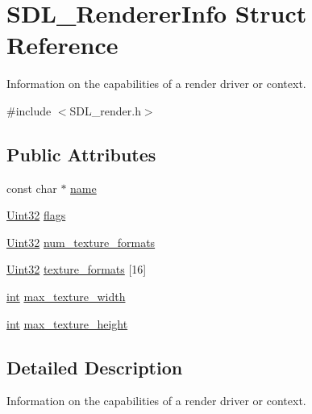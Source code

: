 \hypertarget{struct_s_d_l___renderer_info}{}\section{S\+D\+L\+\_\+\+Renderer\+Info Struct Reference}
\label{struct_s_d_l___renderer_info}


Information on the capabilities of a render driver or context.  




{\ttfamily \#include $<$S\+D\+L\+\_\+render.\+h$>$}

\subsection*{Public Attributes}
\begin{DoxyCompactItemize}
\item 
const char $\ast$ \mbox{\hyperlink{struct_s_d_l___renderer_info_a433ecb2865c81ba9f28038e56a4ae6f3}{name}}
\item 
\mbox{\hyperlink{_s_d_l__stdinc_8h_add440eff171ea5f55cb00c4a9ab8672d}{Uint32}} \mbox{\hyperlink{struct_s_d_l___renderer_info_a95cf0ffd1704fd0a4dd8ceac6c9f0542}{flags}}
\item 
\mbox{\hyperlink{_s_d_l__stdinc_8h_add440eff171ea5f55cb00c4a9ab8672d}{Uint32}} \mbox{\hyperlink{struct_s_d_l___renderer_info_acdec165b2053b914313f5996983ec6b8}{num\+\_\+texture\+\_\+formats}}
\item 
\mbox{\hyperlink{_s_d_l__stdinc_8h_add440eff171ea5f55cb00c4a9ab8672d}{Uint32}} \mbox{\hyperlink{struct_s_d_l___renderer_info_a88450f9d48e593ec4571e3ba7cc3427d}{texture\+\_\+formats}} \mbox{[}16\mbox{]}
\item 
\mbox{\hyperlink{warnings_8h_a74f207b5aa4ba51c3a2ad59b219a423b}{int}} \mbox{\hyperlink{struct_s_d_l___renderer_info_a6e6757e3d5c1f0922adaba39380edfa6}{max\+\_\+texture\+\_\+width}}
\item 
\mbox{\hyperlink{warnings_8h_a74f207b5aa4ba51c3a2ad59b219a423b}{int}} \mbox{\hyperlink{struct_s_d_l___renderer_info_a87c6a13e8d535c2148f8913c05e13102}{max\+\_\+texture\+\_\+height}}
\end{DoxyCompactItemize}


\subsection{Detailed Description}
Information on the capabilities of a render driver or context. 

